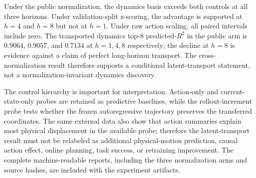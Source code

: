 \documentclass{article}
\begin{document}
\begin{table}[H]
\centering
\scriptsize
\setlength{\tabcolsep}{3pt}
\caption{Paired predicted-$R^2$ contrasts for the transferred dynamics top-$8$
basis. Each entry is dynamics basis minus the indicated control, with a 95\%
episode-cluster bootstrap interval. The basis is fit outside the external
validation trajectories.}
\label{tab:supp-lewm-transport}
\end{table}

Under the public normalization, the dynamics basis exceeds both controls at all
three horizons. Under validation-split z-scoring, the advantage is supported at
$h=4$ and $h=8$ but not at $h=1$. Under raw action scaling, all paired
intervals include zero. The transported dynamics top-$8$ predicted-$R^2$ in
the public arm is $0.9064$, $0.9057$, and $0.7134$ at $h=1,4,8$ respectively;
the decline at $h=8$ is evidence against a claim of perfect long-horizon
transport. The cross-normalization result therefore supports a conditional
latent-transport statement, not a normalization-invariant dynamics discovery.

The control hierarchy is important for interpretation. Action-only and
current-state-only probes are retained as predictive baselines, while the
rollout-increment probe tests whether the frozen autoregressive trajectory
preserves the transferred coordinates. The same external data also show that
action summaries explain most physical displacement in the available probe;
therefore the latent-transport result must not be relabeled as additional
physical-motion prediction, causal action effect, online planning, task
success, or retraining improvement. The complete machine-readable reports,
including the three normalization arms and source hashes, are included with
the experiment artifacts.
\end{document}
